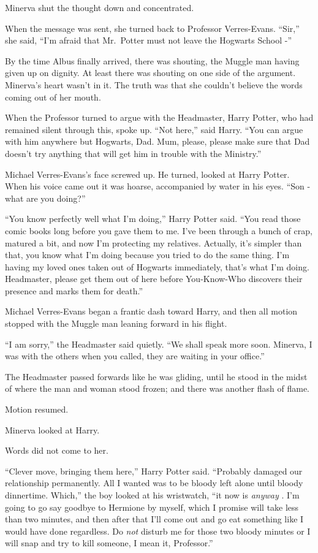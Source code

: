 Minerva shut the thought down and concentrated.

When the message was sent, she turned back to Professor Verres-Evans.
``Sir,'' she said, ``I'm afraid that Mr.~Potter must not leave the
Hogwarts School -''

By the time Albus finally arrived, there was shouting, the Muggle man
having given up on dignity. At least there was shouting on one side of
the argument. Minerva's heart wasn't in it. The truth was that she
couldn't believe the words coming out of her mouth.

When the Professor turned to argue with the Headmaster, Harry Potter,
who had remained silent through this, spoke up. ``Not here,'' said
Harry. ``You can argue with him anywhere but Hogwarts, Dad. Mum, please,
please make sure that Dad doesn't try anything that will get him in
trouble with the Ministry.''

Michael Verres-Evans's face screwed up. He turned, looked at Harry
Potter. When his voice came out it was hoarse, accompanied by water in
his eyes. ``Son - what are you doing?''

``You know perfectly well what I'm doing,'' Harry Potter said. ``You
read those comic books long before you gave them to me. I've been
through a bunch of crap, matured a bit, and now I'm protecting my
relatives. Actually, it's simpler than that, you know what I'm doing
because you tried to do the same thing. I'm having my loved ones taken
out of Hogwarts immediately, that's what I'm doing. Headmaster, please
get them out of here before You-Know-Who discovers their presence and
marks them for death.''

Michael Verres-Evans began a frantic dash toward Harry, and then all
motion stopped with the Muggle man leaning forward in his flight.

``I am sorry,'' the Headmaster said quietly. ``We shall speak more soon.
Minerva, I was with the others when you called, they are waiting in your
office.''

The Headmaster passed forwards like he was gliding, until he stood in
the midst of where the man and woman stood frozen; and there was another
flash of flame.

Motion resumed.

Minerva looked at Harry.

Words did not come to her.

``Clever move, bringing them here,'' Harry Potter said. ``Probably
damaged our relationship permanently. All I wanted was to be bloody left
alone until bloody dinnertime. Which,'' the boy looked at his
wristwatch, ``it now is \emph{anyway} . I'm going to go say goodbye to
Hermione by myself, which I promise will take less than two minutes, and
then after that I'll come out and go eat something like I would have
done regardless. Do \emph{not} disturb me for those two bloody minutes
or I will snap and try to kill someone, I mean it, Professor.''


